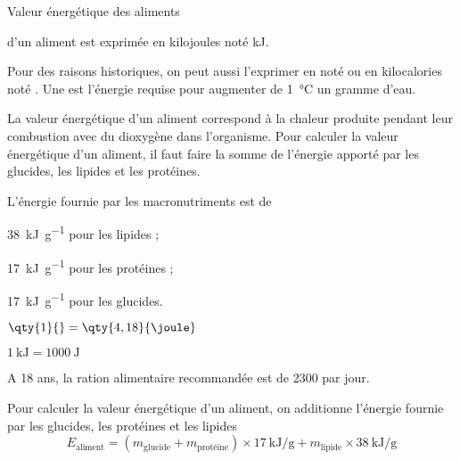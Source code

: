\newpage\vspace*{-36pt}
\begin{doc}{Valeur énergétique des aliments}
  \begin{importants}  
     d'un aliment est exprimée en kilojoules noté \unit{\kilo\joule}.
  \end{importants}
  Pour des raisons historiques, on peut aussi l'exprimer en  noté \unit{\cal} ou en kilocalories noté \unit{\kcal}.
  Une  est l'énergie requise pour augmenter de \qty{1}{\degreeCelsius} un gramme d'eau.

  La valeur énergétique d'un aliment correspond à la chaleur produite pendant leur combustion avec du dioxygène dans l'organisme.
  Pour calculer la valeur énergétique d'un aliment, il faut faire la somme de l'énergie apporté par les glucides, les lipides et les protéines.
  
  \begin{importants}
    L'énergie fournie par les macronutriments est de
    \begin{listePoints}[2]
      \item \qty{38}{\kilo\joule\per\g} pour les lipides ;
      \item \qty{17}{\kilo\joule\per\g} pour les protéines ;
      \item \qty{17}{\kilo\joule\per\g} pour les glucides.
    \end{listePoints}
  \end{importants}

  \begin{donnees}[2]
    \item $\qty{1}{\cal} = \qty{4,18}{\joule}$
    \item $\qty{1}{\kilo\joule} = \qty{1000}{\joule}$
    \item A 18 ans, la ration alimentaire recommandée est de \qty{2300}{\kcal} par jour.
  \end{donnees}
  \vspace*{-12pt}
  Pour calculer la valeur énergétique d'un aliment, on additionne l'énergie fournie par les glucides, les protéines et les lipides
  \begin{equation*}
    E_\text{aliment} 
    = (m_\text{glucide} + m_\text{protéine}) \times \qty{17}{\kilo\joule\per\g}
    +  m_\text{lipide} \times \qty{38}{\kilo\joule\per\g}
  \end{equation*}
\end{doc}

